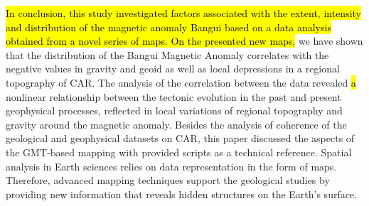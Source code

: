 \documentclass[minerals,article,submit,pdftex,moreauthors]{Definitions/mdpi}
\begin{document}
\hl{In conclusion, this study investigated factors associated with the extent, intensity and distribution of the magnetic anomaly Bangui based on a data analysis obtained from a novel series of maps. On the presented new maps, }we have shown that the distribution of the Bangui Magnetic Anomaly correlates with the negative values in gravity and geoid as well as local depressions in a regional topography of CAR. The analysis of the correlation between the data\hl{ }revealed \hl{a} nonlinear relationship between the tectonic evolution in the past and present geophysical processes, reflected in local variations of regional topography and gravity around the magnetic anomaly. Besides the analysis of coherence of the geological and geophysical datasets on CAR, this paper discussed the aspects of the GMT-based mapping with provided scripts as a technical reference. Spatial analysis in Earth sciences relies on data representation in the form of maps. Therefore, advanced mapping techniques support the geological studies by providing new information that reveals hidden structures on the Earth's surface. 






\end{document}
